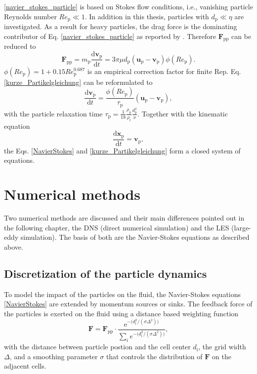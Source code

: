 \documentclass[11pt,a4paper,openany,oneside,parskip=half*]{article}
\renewcommand*\vec[1]{\boldsymbol{#1}}
\begin{document}
\eqref{navier_stokes_particle} is based on Stokes flow conditions, i.e., vanishing particle Reynolds number $Re_\mathrm{p} \ll 1$. In addition in this thesis, particles with $d_\mathrm{p} \ll \eta$ are investigated.
As a result for heavy particles, the drag force is the dominating contributor of Eq. \eqref{navier_stokes_particle} as reported by \cite{TheImportanceOfTheFocusActingOnParticlesInTurbulentFlows}. Therefore $\vec{F}_\mathrm{pp}$ can be reduced to
\begin{equation} \label{kurze_Partikelgleichung}
\vec{F}_\mathrm{pp} =  m_\mathrm{p} \frac{\mathrm{d}\vec{v}_\mathrm{p}}{\mathrm{d}t} = 3 \pi \mu d_\mathrm{p}(\vec{u}_\mathrm{p}-\vec{v}_\mathrm{p})\phi(Re_\mathrm{p}).
\end{equation}
$\phi(Re_\mathrm{p}) = 1+0.15Re_\mathrm{p}^\mathrm{0.687}$ is an empirical correction factor for finite Rep. \newline Eq. \eqref{kurze_Partikelgleichung} can be reformulated to
\begin{equation} \label{shortPaticleDynamics}
\frac{\mathrm{d}\vec{v}_\mathrm{p}}{\mathrm{d}t} = \frac{\phi(Re_\mathrm{p})}{\tau_\mathrm{p}}(\vec{u}_\mathrm{p}-\vec{v}_\mathrm{p}),
\end{equation}
with the particle relaxation time $\tau_\mathrm{p}=\frac{1}{18}\frac{\rho_\mathrm{p}}{\rho_\mathrm{f}}\frac{d_\mathrm{p}^\mathrm{2}}{\nu}$. 
\newline
Together with the kinematic equation    
\begin{equation}
 \frac{\mathrm{d}\vec{x}_\mathrm{p}}{\mathrm{d}t} = \vec{v}_\mathrm{p},
\end{equation}
the Eqs.  \eqref{NavierStokes} and \eqref{kurze_Partikelgleichung} form a closed system of equations.
\pagebreak
\section{Numerical methods} %
Two numerical methods are discussed and their main differences pointed out in the following chapter, the DNS (direct numerical simulation) and the LES (large-eddy simulation). The basis of both are the Navier-Stokes equations as described above.
\newline
\subsection{Discretization of the particle dynamics}

To model the impact of the particles on the fluid, the Navier-Stokes equations \eqref{NavierStokes} are extended by momentum sources or sinks. The feedback force of the particles is exerted on the fluid using a distance based weighting function
\begin{equation}
\vec{F} = \vec{F}_\mathrm{pp} \cdot \frac{\mathrm{e}^{- \big(d_\mathrm{i}^\mathrm{2}/(\sigma \Delta^\mathrm{2})\big)}}{\sum \limits_{i} e^{- \big(d_\mathrm{i}^\mathrm{2}/(\sigma \Delta^\mathrm{2}) \big)}},
\end{equation}
with the distance between particle postion and the cell center $d_\mathrm{i}$, the grid width $\Delta$, and a smoothing parameter $\sigma$ that controls the distribution of $\vec{F}$ on the adjacent cells.
\end{document}
